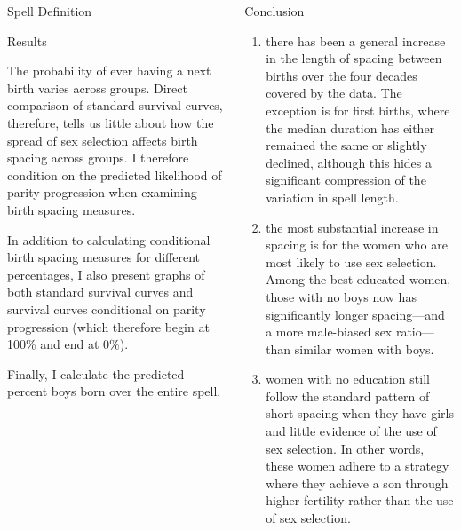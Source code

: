 \documentclass[final]{beamer}
\newlength{\onecolwid}
\newlength{\twocolwid}
\begin{document}
\begin{frame}{}
\begin{columns}[t]
\begin{column}{\twocolwid}
\begin{block}{Spell Definition}
\end{block}

\begin{block}{Results}


The probability of ever having a next birth varies across groups.
Direct comparison of standard survival curves, therefore, tells us little 
about how the spread of sex selection affects birth spacing across groups.
I therefore condition on the predicted likelihood of parity 
progression when examining birth spacing measures.

In addition to calculating conditional birth spacing measures for different 
percentages, I also present graphs of both standard survival curves and
survival curves conditional on parity progression (which therefore
begin at 100\% and end at 0\%).

Finally, I calculate the predicted percent boys born over the entire spell.


\end{block}


\end{column}


\begin{column}{\onecolwid}

\begin{alertblock}{Conclusion}

\begin{enumerate}
\item there has been a general increase in the length of spacing between births
over the four decades covered by the data.
The exception is for first births, where the median duration has either
remained the same or slightly declined, although this hides a
significant compression of the variation in spell length.

\item the most substantial increase in spacing is for the women who
are most likely to use sex selection.
Among the best-educated women, those with no boys now has 
significantly longer spacing---and a more male-biased sex ratio---than 
similar women with boys.

\item women with no education still follow the standard pattern of
short spacing when they have girls and little evidence of the use of sex
selection.
In other words, these women adhere to a strategy where they achieve a
son through higher fertility rather than the use of sex selection.


\end{enumerate}
\end{alertblock}
\end{column}
\end{columns}
\end{frame}
\end{document}
